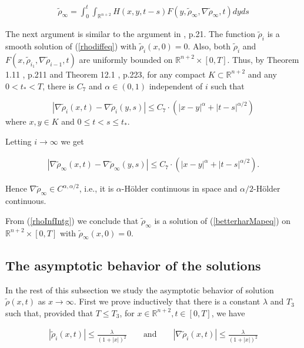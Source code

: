 \begin{align} \tilde{\rho}_\infty=\int_0^t \int_{\mathbb{R}^{n+2}} H(x,y ,t-s)F(y,\tilde{ \rho}_{\infty},
\nabla\tilde{\rho}_{\infty} ,t)dyds \label{rhoInfIntg}
\end{align}

The next argument is similar to the argument in \cite{LiTam}, p.21.
The function $\tilde{\rho}_{i}$ is a smooth solution of
(\ref{rhodiffeq}) with $\tilde{\rho}_i(x,0)=0$. Also, both
 $\tilde{\rho}_{i}$
and $F(x,\tilde{\rho}_{i_1},\nabla \tilde{\rho}_{i-1},t)$ are
uniformly bounded on $\mathbb{R}^{n+2} \times[0,T]$. Thus, by
Theorem 1.11 \cite{LSU}, p.211 and Theorem 12.1 \cite{LSU}, p.223,
for any compact $K \subset \mathbb{R}^{n+2}$ and any $0<t_*<T$,
there is $C_7$ and $\alpha \in(0,1)$ independent of $i$ such that

\[
| \nabla \tilde{\rho}_{i}(x,t) -\nabla \tilde{\rho}_{i}(y,s)| \leq
C_7 \cdot \left( |x-y|^\alpha+ |t-s|^{\alpha/2} \right)
\]
where $x,y \in K$ and $0 \leq t< s \leq t_*$.

Letting $i \rightarrow \infty$ we get

\begin{align}
| \nabla \tilde{\rho}_{\infty}(x,t) -\nabla
\tilde{\rho}_{\infty}(y,s)| \leq C_7 \cdot \left( |x-y|^\alpha+
|t-s|^{\alpha/2} \right). \label{rhoHolder}
\end{align}

Hence $\nabla \tilde{\rho}_{\infty}\in C^{\alpha,\alpha/2}$, i.e.,
it  is $\alpha$-H\"{o}lder continuous in space and
$\alpha/2$-H\"older continuous.

From (\ref{rhoInfIntg}) we conclude that $\tilde{\rho}_{\infty}$ is
a solution of (\ref{betterharMapeq}) on $\mathbb{R}^{n+2} \times
[0,T]$ with $\tilde{\rho}_{\infty}(x,0)=0$.





\subsection{The asymptotic behavior of the
solutions}\label{harmsec}

In the rest of this subsection we study the asymptotic behavior of
solution $\tilde{\rho}(x,t)$  as $x \rightarrow \infty$. First we
prove inductively that there is a constant $\lambda$ and $T_3$ such
that, provided that $T\le T_3$, for $x \in \mathbb{R}^{n+2}, t \in
[0,T]$, we have

\begin{align}
| \tilde{\rho}_i (x,t) | \leq  \frac{\lambda }{(1+|x|)^2} \qquad
\text{and} \qquad |\nabla \tilde{\rho}_i (x,t) | \leq
\frac{\lambda}{(1+|x|)^2} \label{rho_iDcay}
\end{align}

